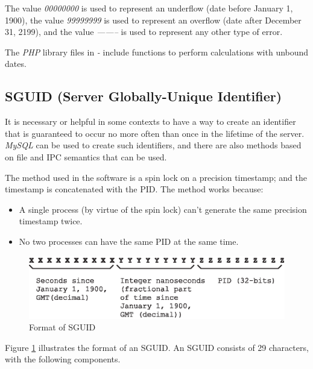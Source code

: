 The value \emph{00000000} is used to represent an underflow (date before January
1, 1900), the value \emph{99999999} is used to represent an overflow (date
after December 31, 2199), and the value \emph{--------} is used to represent
any other type of error.

The \emph{PHP} library files in \emph{\productbasename{}-\productversion{}}
include functions to perform calculations with unbound dates.


\subsection{SGUID (Server Globally-Unique Identifier)}
\label{ctbg0:sdty0:ssgu0}

It is necessary or helpful in some contexts to have a way to create an
identifier that is guaranteed to occur no more often than once in the lifetime
of the server.  \emph{MySQL} can be used to create such identifiers, and there
are also methods based on file and IPC semantics that can be used.

The method used in the software is a spin lock on a precision
timestamp; and the timestamp is concatenated with the PID.  The method works
because:

\begin{itemize}
\item A single process (by virtue of the spin lock) can't generate the same
      precision timestamp twice.
\item No two processes can have the same PID at the same time.
\end{itemize}

\begin{figure}
\centering
\includegraphics[width=4.6in]{c_tbg0/sguidformat01.eps}
\caption{Format of SGUID}
\label{fig:ctbg0:sdty0:ssgu0:00}
\end{figure}

Figure \ref{fig:ctbg0:sdty0:ssgu0:00} illustrates the format of
an SGUID.  An SGUID consists of 29 characters, with the following
components.

